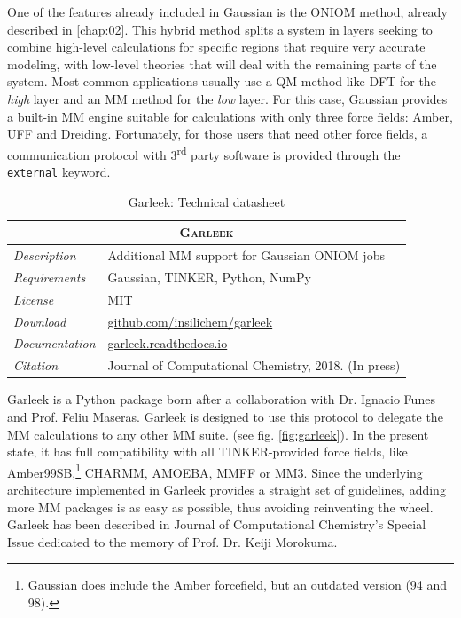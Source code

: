 One of the features already included in Gaussian is the ONIOM method,\cite{svensson1996oniom} already described in \autoref{chap:02}. This hybrid method splits a system in layers seeking to combine high-level calculations for specific regions that require very accurate modeling, with low-level theories that will deal with the remaining parts of the system. Most common applications usually use a QM method like DFT for the \textit{high} layer and an MM method for the \textit{low} layer. For this case, Gaussian provides a built-in MM engine suitable for calculations with only three force fields: Amber,\cite{cornell1995second} UFF\cite{Rappe1992} and Dreiding.\cite{Mayo1990} Fortunately, for those users that need other force fields, a communication protocol with 3\textsuperscript{rd} party software is provided through the \texttt{external} keyword.

\begin{table}[hbtp]
	\caption{Garleek: Technical datasheet}
	\footnotesize
	\newcommand{\tableheading}[1]{\multicolumn{2}{c}{\textsc{#1}}}
	\begin{tabularx}{\textwidth}{RL}
		\toprule
		\tableheading{Garleek}\\
		\toprule
		\textit{Description} & Additional MM support for Gaussian ONIOM jobs \\
		\midrule
		\textit{Requirements} & Gaussian, TINKER, Python, NumPy \\
		\midrule
		\textit{License} & MIT \\
		\midrule
		\textit{Download} & \href{https://github.com/insilichem/garleek}{github.com/insilichem/garleek} \\
		\midrule
		\textit{Documentation} & \href{http://garleek.readthedocs.io}{garleek.readthedocs.io} \\
		\midrule
		\textit{Citation} & Journal of Computational Chemistry, 2018. (In press) \\
		\bottomrule

	\end{tabularx}
\end{table}

Garleek is a Python package born after a collaboration with Dr. Ignacio Funes and Prof. Feliu Maseras. Garleek is designed to use this protocol to delegate the MM calculations to any other MM suite. (see fig. \ref{fig:garleek}). In the present state, it has full compatibility with all TINKER-provided force fields, like Amber99SB,\cite{amber99sb}\footnote{Gaussian does include the Amber forcefield, but an outdated version (94 and 98).} CHARMM,\cite{mackerell1998all} AMOEBA,\cite{amoeba} MMFF\cite{halgren1996merck} or MM3.\cite{allinger1989molecular} Since the underlying architecture implemented in Garleek provides a straight set of guidelines, adding more MM packages is as easy as possible, thus avoiding reinventing the wheel. Garleek has been described in Journal of Computational Chemistry's Special Issue\cite{garleek} dedicated to the memory of Prof. Dr. Keiji Morokuma.




